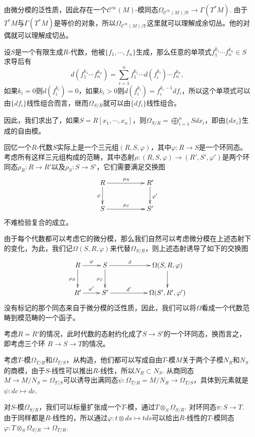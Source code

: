 由微分模的泛性质，因此存在一个$\mathcal{C}^\infty(M)$-模同态$\Omega_{\mathcal{C}^\infty(M)/\mathbb{R}}\to \Gamma(T^*M)$. 由于$T^*M$与$\Gamma(T^*M)$是等价的对象，所以$\Omega_{\mathcal{C}^\infty(M)/\mathbb{R}}$这里就可以理解成余切丛。他的对偶就可以理解成切丛。

\para 设$S$是一个有限生成$R$-代数，他被$\{f_1,\cdots,f_n\}$生成，那么任意的单项式$f_1^{k_1}\cdots f_n^{k_n}\in S$求导后有
\[
	d(f_1^{k_1}\cdots f_n^{k_n})=\sum_{i=1}^n f_1^{k_1}\cdots d(f_i^{k_i})\cdots f_n^{k_n},
\]
如果$k_i=0$则$d(f_i^{k_i})=0$，如果$k_i>0$则$d(f_i^{k_i})=f_i^{k_i-1}df_i$，所以这个单项式可以由$\{df_i\}$线性组合而言，继而$\Omega_{S/R}$就可以由$\{df_i\}$线性组合。

因此，我们求出了，如果$S=R[x_1,\cdots,x_n]$，则$\Omega_{S/R}=\bigoplus_{i=1}^n Sdx_i$，即由$\{dx_i\}$生成的自由模。

\para 回忆一个$R$-代数$S$实际上是一个三元组$(R,S,\varphi)$，其中$\varphi:R\to S$是一个环同态。考虑所有这样三元组构成的范畴，其中态射$\rho:(R,S,\varphi)\to (R',S',\varphi')$是两个环同态$\rho_R:R\to R'$以及$\rho_S:S\to S'$，它们需要满足交换图
\[
\begin{xy}
	\xymatrix
	{
		R\ar[rr]^{\rho_R} \ar[d]_{\varphi}&&R' \ar[d]^{\varphi'}\\
		S\ar[rr]^{\rho_S}&&S'
	}
\end{xy}
\]
不难检验复合的成立。

由于每个代数都可以考虑它的微分模，那么我们自然可以考虑微分模在上述态射下的变化，为此，我们记$\Omega(S,R,\varphi)$来代替$\Omega_{S/R}$，则上述态射诱导了如下的交换图
\[
\begin{xy}
	\xymatrix
	{
		R\ar[r]^{\varphi}\ar[d]_{\rho_R}&S\ar[rr]^-{d} \ar[d]_{\rho_S}&&\Omega(S,R,\varphi) \ar[d]\\
		R'\ar[r]^{\varphi'}&S'\ar[rr]^-{d'}&&\Omega(S',R',\varphi')
	}
\end{xy}
\]
没有标记的那个同态来自于微分模的泛性质，因此，我们可以将$\Omega$看成一个代数范畴到模范畴的一个函子。

\para 考虑$R=R'$的情况，此时代数的态射约化成了$S\to S'$的一个环同态，换而言之，即考虑三个环
$R\to S\to T$的情况。

考虑$T$-模$\Omega_{T/R}$和$\Omega_{T/S}$，从构造，他们都可以写成自由$T$-模$M$关于两个子模$N_R$和$N_S$的商模，由于$S$-线性可以推出$R$-线性，所以$N_R\subset N_S$. 从商同态$M\to M/N_S=\Omega_{T/S}$可以诱导出满同态$\psi:\Omega_{T/R}=M/N_R\to \Omega_{T/S}$，具体到元素就是$\psi:dc\mapsto dc$. 

对$S$-模$\Omega_{S/R}$，我们可以标量扩张成一个$T$-模，通过$T\otimes_S \Omega_{S/R}$. 对环同态$\pi:S\to T$. 由于同样都是$R$-线性的，所以通过$\varphi:t\otimes ds\mapsto tds$可以给出$R$-线性的$T$-模同态$\varphi:T\otimes_S \Omega_{S/R}\to \Omega_{T/R}$.

